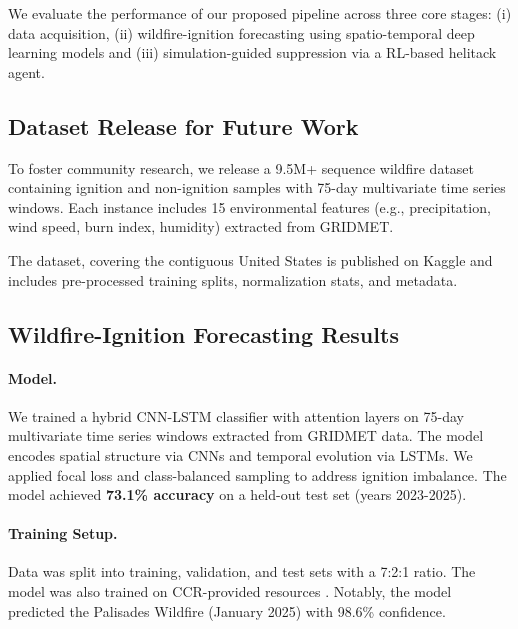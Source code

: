 \documentclass[conference]{IEEEtran}
\begin{document}
We evaluate the performance of our proposed pipeline across three core stages: (i) data acquisition, (ii) wildfire-ignition forecasting using spatio-temporal deep learning models and (iii) simulation-guided suppression via a RL-based helitack agent.

\subsection{Dataset Release for Future Work}

To foster community research, we release a 9.5M+ sequence wildfire dataset containing ignition and non-ignition samples with 75-day multivariate time series windows. Each instance includes 15 environmental features (e.g., precipitation, wind speed, burn index, humidity) extracted from GRIDMET.

The dataset, covering the contiguous United States is published on Kaggle and includes pre-processed training splits, normalization stats, and metadata.


\subsection{Wildfire-Ignition Forecasting Results}

\paragraph{Model.} We trained a hybrid CNN-LSTM classifier with attention layers on 75-day multivariate time series windows extracted from GRIDMET data. The model encodes spatial structure via CNNs and temporal evolution via LSTMs. We applied focal loss and class-balanced sampling to address ignition imbalance. The model achieved \textbf{73.1\% accuracy} on a held-out test set (years 2023-2025).

\paragraph{Training Setup.} Data was split into training, validation, and test sets with a 7:2:1 ratio. The model was also trained on CCR-provided resources \cite{ccr}. Notably, the model predicted the Palisades Wildfire (January 2025) with 98.6\% confidence.
\end{document}
